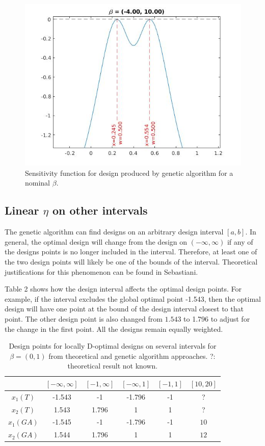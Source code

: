 \documentclass[11pt,a4paper]{article}
\begin{document}
\begin{figure}
\centering
\includegraphics[scale=0.5]{figures/fig1.jpg}
\caption{Sensitivity function for design produced by genetic algorithm for a nominal $\beta$.}
\end{figure}

\subsection{Linear $\eta$ on other intervals}
The genetic algorithm can find designs on an arbitrary design interval $[a,b]$. In general, the optimal design will change from the design on $(-\infty, \infty)$ if any of the designs points is no longer included in the interval. Therefore, at least one of the two design points will likely be one of the bounds of the interval. Theoretical justifications for this phenomenon can be found in Sebastiani. 

Table 2 shows how the design interval affects the optimal design points. For example, if the interval excludes the global optimal point -1.543, then the optimal design will have one point at the bound of the design interval closest to that point. The other design point is also changed from $1.543$ to 1.796 to adjust for the change in the first point. All the designs remain equally weighted.

\begin{table}
\centering
\begin{tabular}{|c|c|c|c|c|c|}
\hline 
  & $[-\infty, \infty]$  & $[-1, \infty]$ & $[-\infty,1]$ & $[-1,1]$ & $[10, 20]$\\ 
\hline 
$x_1 (T)$ & -1.543 & -1 & -1.796 & -1  & ?\\ 
\hline 
$x_2 (T)$ & 1.543 & 1.796 & 1 & 1 & ?\\ 

\hline
$x_1 (GA)$ & -1.545 & -1 & -1.796 & -1 & $10$\\
\hline
$x_2 (GA)$ & 1.544 & 1.796 & 1 & 1 & $12$\\
\hline
\end{tabular}
\caption{Design points for locally D-optimal designs on several intervals for $\beta = (0,1)$ from theoretical and genetic algorithm approaches. ?: theoretical result not known.}
\end{table}
\end{document}
